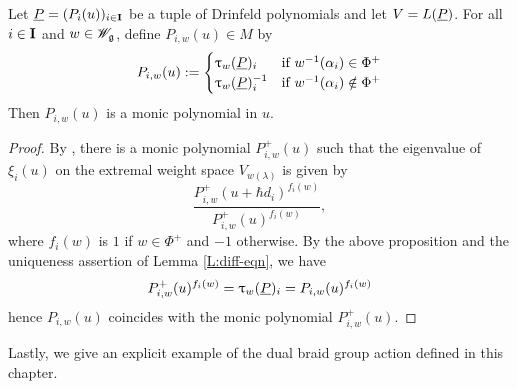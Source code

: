 \begin{corollary}\label{C:Tan-monic}
    Let $\underline{P} = (P_i(u))_{i\in\mathbf{I}}$ be a tuple of Drinfeld polynomials and let $V = L(\underline{P})$.
    For all $i\in\mathbf{I}$ and $w\in\mathscr{W}_{\mathfrak{g}}$, define $P_{i,w}(u)\in M$ by
    \[P_{i,w}(u) :=
    \begin{cases}
        \uptau_w(\underline{P})_i & \text{if } w^{-1}(\alpha_i)\in\Phi^+ \\
        \uptau_w(\underline{P})_i^{-1} & \text{if } w^{-1}(\alpha_i)\notin\Phi^+
    \end{cases}\]
    Then $P_{i,w}(u)$ is a monic polynomial in $u$.
\end{corollary}
\begin{proof}
    By \cite[Remark 2.2]{chari_fundamental_1991}, there is a monic polynomial $P^+_{i,w}(u)$ such that the eigenvalue of $\xi_i(u)$ on the extremal weight space $V_{w(\lambda)}$ is given by
    \[\frac{P^+_{i,w}(u+\hbar d_i)^{f_i(w)}}{P^+_{i,w}(u)^{f_i(w)}},\]
    where $f_i(w)$ is $1$ if $w\in\Phi^+$ and $-1$ otherwise.
    By the above proposition and the uniqueness assertion of Lemma \ref{L:diff-eqn}, we have
    \[P^+_{i,w}(u)^{f_i(w)} = \uptau_w(\underline{P})_i = P_{i,w}(u)^{f_i(w)}\]
    hence $P_{i,w}(u)$ coincides with the monic polynomial $P^+_{i,w}(u)$.
\end{proof}

Lastly, we give an explicit example of the dual braid group action defined in this chapter.

